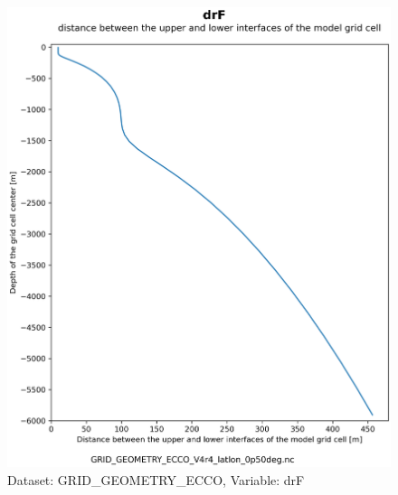 \begin{figure}[H]
\centering
\includegraphics[scale=0.55]{../images/v4r4/plots/latlon_plots_coords/Geometry_Parameters_for_the_0.5_degree_Lat-Lon_Model_Grid_(Version_4_Release_4)/drF.png}
\caption{Dataset: GRID\_GEOMETRY\_ECCO, Variable: drF}
\label{tab:table-GRID_GEOMETRY_ECCO_drF-Plot}
\end{figure}
\newpage
\pagebreak

